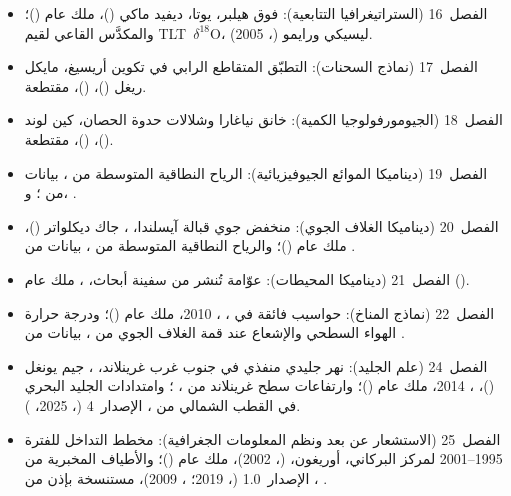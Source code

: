 \begin{itemize}
  \item الفصل~16 (الستراتيغرافيا التتابعية):  فوق هيلبر، يوتا، ديفيد ماكي ()، ملك عام ()؛ والمكدَّس القاعي  لقيم \mbox{\textdir TLT $\delta^{18}$O}، ليسيكي ورايمو (، 2005).
  \item الفصل~17 (نماذج السحنات): التطبّق المتقاطع الرابي في تكوين أريسيغ، مايكل ريغل ()،  ()، مقتطعة.
  \item الفصل~18 (الجيومورفولوجيا الكمية): خانق نياغارا وشلالات حدوة الحصان، كين لوند ()،  ()، مقتطعة.
  \item الفصل~19 (ديناميكا الموائع الجيوفيزيائية): الرياح النطاقية المتوسطة من ، بيانات من ؛ و، .
  \item الفصل~20 (ديناميكا الغلاف الجوي): منخفض جوي قبالة آيسلندا، ، جاك ديكلواتر ()، ملك عام ()؛ والرياح النطاقية المتوسطة من ، بيانات من .
  \item الفصل~21 (ديناميكا المحيطات): عوّامة  تُنشر من سفينة أبحاث، ، ملك عام ().
  \item الفصل~22 (نماذج المناخ): حواسيب فائقة في ، ، 2010، ملك عام ()؛ ودرجة حرارة الهواء السطحي والإشعاع عند قمة الغلاف الجوي من ، بيانات من .
  \item الفصل~24 (علم الجليد): نهر جليدي منفذي في جنوب غرب غرينلاند، ، جيم يونغل ()، ، 2014، ملك عام ()؛ وارتفاعات سطح غرينلاند من ، ؛ وامتدادات الجليد البحري في القطب الشمالي من ، الإصدار~4 (، 2025، ).
  \item الفصل~25 (الاستشعار عن بعد ونظم المعلومات الجغرافية): مخطط التداخل للفترة 1995--2001 لمركز  البركاني، أوريغون،  (، 2002)، ملك عام ()؛ والأطياف المخبرية من ، الإصدار~1.0 (، 2019؛ ، 2009)، مستنسخة بإذن من .

\end{itemize}
